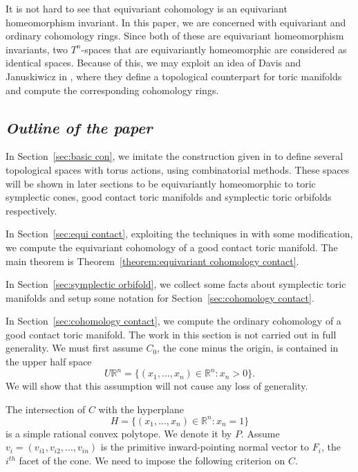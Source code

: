 \documentclass[12pt]{amsart}
\theoremstyle{definition}
\numberwithin{equation}{section}
\begin{document}
It is not hard to see that equivariant cohomology is an equivariant
homeomorphism invariant. In this paper, we are concerned with
equivariant and ordinary cohomology rings. Since both of these are
equivariant homeomorphism invariants, two $T^n$-spaces that are
equivariantly homeomorphic are considered as identical spaces.
Because of this, we may exploit an idea of Davis and Januskiwicz in
\cite{DJ}, where they define a topological counterpart for toric
manifolds and compute the corresponding cohomology rings.

\subsection{\it Outline of the paper}

In Section~\ref{sec:basic con}, we imitate the construction given in
\cite{DJ} to define several topological spaces with torus actions,
using combinatorial methods. These spaces will be shown in later
sections to be equivariantly homeomorphic to toric symplectic cones,
good contact toric manifolds and symplectic toric orbifolds
respectively.

In Section~\ref{sec:equi contact}, exploiting the techniques in
\cite{DJ} with some modification, we compute the equivariant
cohomology of a good contact toric manifold. The main theorem is
Theorem~\ref{theorem:equivariant cohomology contact}.

In Section~\ref{sec:symplectic orbifold}, we collect some facts
about symplectic toric manifolds and setup some notation for
Section~\ref{sec:cohomology contact}.

In Section~\ref{sec:cohomology contact}, we compute the ordinary
cohomology of a good contact toric manifold. The work in this
section is not carried out in full generality. We must first assume
$C_{0}$, the cone minus the origin, is contained in the upper half
space
\begin{equation}
U{{\mathbb{R}}}^n = \{(x_{1},...,x_{n})\in {{\mathbb{R}}}^n : x_{n}>0\}.
\end{equation}
We will show that this assumption will not cause any loss of
generality.

The intersection of $C$ with the hyperplane
\begin{equation}
H = \{(x_{1},...,x_{n})\in {{\mathbb{R}}}^n : x_{n}=1\}
\end{equation}
is a simple rational convex polytope. We denote it by $P$. Assume
$v_{i}=(v_{i1},v_{i2},...,v_{in})$ is the primitive inward-pointing
normal vector to  $F_{i}$, the $i^{th}$ facet of the cone. We need
to impose the following criterion on $C$.
\end{document}
